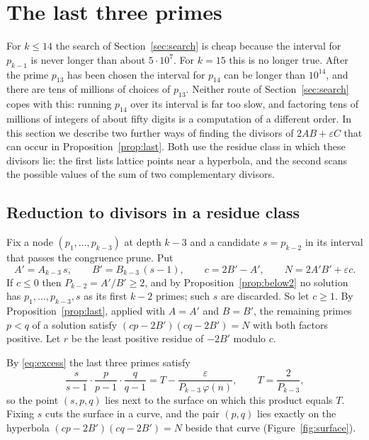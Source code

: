 \documentclass[11pt,reqno]{amsart}
\numberwithin{equation}{section}
\theoremstyle{plain}
\theoremstyle{definition}
\theoremstyle{remark}
\begin{document}
\section{The last three primes}\label{sec:three}

For $k\le14$ the search of Section~\ref{sec:search} is cheap because
the interval for $p_{k-1}$ is never longer than about $5\cdot10^7$. For
$k=15$ this is no longer true. After the prime $p_{13}$ has been chosen
the interval for $p_{14}$ can be longer than $10^{14}$, and there are
tens of millions of choices of $p_{13}$. Neither route of
Section~\ref{sec:search} copes with this: running $p_{14}$ over its
interval is far too slow, and factoring tens of millions of integers of
about fifty digits is a computation of a different order. In this
section we describe two further ways of finding the divisors of
$2AB+\varepsilon C$ that can occur in Proposition~\ref{prop:last}.
Both use the residue class in which these divisors lie: the first
lists lattice points near a hyperbola, and the second scans the
possible values of the sum of two complementary divisors.

\subsection{Reduction to divisors in a residue class}
Fix a node $(p_1,\dots,p_{k-3})$ at depth $k-3$ and a candidate
$s=p_{k-2}$ in its interval that passes the congruence prune. Put
\[
  A'=A_{k-3}\,s,\qquad B'=B_{k-3}\,(s-1),\qquad c=2B'-A',\qquad
  N=2A'B'+\varepsilon c .
\]
If $c\le0$ then $P_{k-2}=A'/B'\ge2$, and by
Proposition~\ref{prop:below2} no solution has $p_1,\dots,p_{k-3},s$ as
its first $k-2$ primes; such $s$ are discarded. So let $c\ge1$. By
Proposition~\ref{prop:last}, applied with $A=A'$ and $B=B'$, the
remaining primes $p<q$ of a solution satisfy
$(cp-2B')(cq-2B')=N$ with both factors positive. Let $r$ be the least
positive residue of $-2B'$ modulo $c$.

By \eqref{eq:excess} the last three primes satisfy
\[
  \frac{s}{s-1}\cdot\frac{p}{p-1}\cdot\frac{q}{q-1}
  =T-\frac{\varepsilon}{P_{k-3}\,\varphi(n)},\qquad T=\frac{2}{P_{k-3}},
\]
so the point $(s,p,q)$ lies next to the surface on which this product
equals $T$. Fixing $s$ cuts the surface in a curve, and the pair
$(p,q)$ lies exactly on the hyperbola $(cp-2B')(cq-2B')=N$ beside that
curve (Figure~\ref{fig:surface}).
\end{document}
